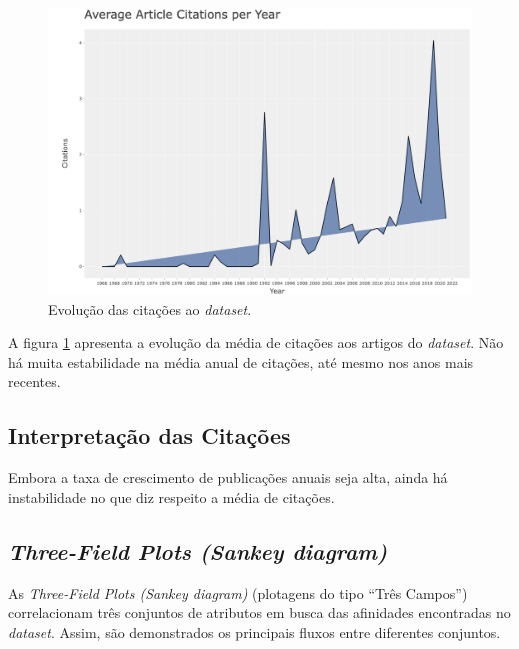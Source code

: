 \begin{figure}
    \centering
    \includegraphics[angle=0,width=1\textwidth]{experiments/tucazorron/PesquisaBibliometrica/GNN/2.png}
    \caption{Evolução das citações ao \textit{dataset}.}
    \label{fig:evol:anual:citacoes:GNN@tucazorron}
\end{figure}

A figura \ref{fig:evol:anual:citacoes:GNN@tucazorron} apresenta a evolução da média de citações aos artigos do \textit{dataset}. Não há muita estabilidade na média anual de citações, até mesmo nos anos mais recentes.

\subsection{Interpretação das Citações}
Embora a taxa de crescimento de publicações anuais seja alta, ainda há instabilidade no que diz respeito a média de citações.

\subsection{\textit{Three-Field Plots (Sankey diagram)}}

As \textit{Three-Field Plots (Sankey diagram)} (plotagens do tipo ``Três Campos'') correlacionam três conjuntos de atributos em busca das afinidades encontradas no \textit{dataset}. Assim, são demonstrados os principais fluxos entre diferentes conjuntos.

